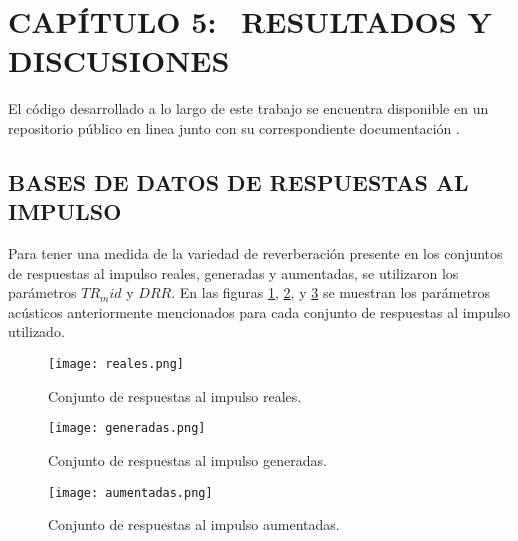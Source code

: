 \section[Resultados y Discusiones]{CAPÍTULO 5:$\ \ \ \ $RESULTADOS Y DISCUSIONES} 
El código desarrollado a lo largo de este trabajo se encuentra disponible en un repositorio público en linea junto con su correspondiente documentación \cite{repo}.

\subsection[Bases de datos de respuestas al impulso]{BASES DE DATOS DE RESPUESTAS AL IMPULSO}

Para tener una medida de la variedad de reverberación presente en los conjuntos de respuestas al impulso reales, generadas y aumentadas, se utilizaron los parámetros $TR_mid$ y $DRR$. En las figuras \ref{fig:cloud_reales}, \ref{fig:cloud_generadas}, y \ref{fig:cloud_aumentadas} se muestran los parámetros acústicos anteriormente mencionados para cada conjunto de respuestas al impulso utilizado.  

\begin{figure}[H]
	\centering{}
	\texttt{[image: reales.png]}
	\caption{Conjunto de respuestas al impulso reales.}
	\label{fig:cloud_reales}
\end{figure}

\begin{figure}[H]
	\centering{}
	\texttt{[image: generadas.png]}
	\caption{Conjunto de respuestas al impulso generadas.}
	\label{fig:cloud_generadas}
\end{figure}

\begin{figure}[H]
	\centering{}
	\texttt{[image: aumentadas.png]}
	\caption{Conjunto de respuestas al impulso aumentadas.}
	\label{fig:cloud_aumentadas}
\end{figure}

